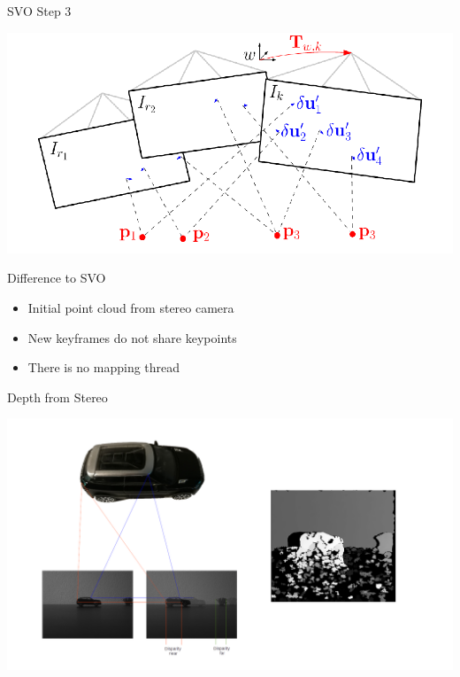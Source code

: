 \documentclass[aspectratio=169]{beamer}
\begin{document}
\begin{frame}{SVO Step 3}
  \begin{center}
    \includegraphics[height=0.9\textheight]{./img/svo_step3.png}
  \end{center}
\end{frame}

\begin{frame}{Difference to SVO}
\begin{itemize}
  \item Initial point cloud from stereo camera
  \item New keyframes do not share keypoints
  \item There is no mapping thread
\end{itemize}
\end{frame}

\begin{frame}{Depth from Stereo}
  \begin{center}
    \includegraphics[height=0.9\textheight]{./img/disparity.png}
  \end{center}
\end{frame}
\end{document}
